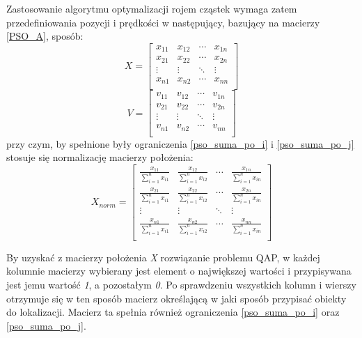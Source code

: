 Zastosowanie algorytmu optymalizacji rojem cząstek wymaga zatem przedefiniowania pozycji i prędkości w następujący, bazujący na macierzy \ref{PSO_A}, sposób:
\newline
\begin{equation}
X=
\begin{bmatrix}
x_{11} & x_{12} & \cdots & x_{1n} \\
x_{21} & x_{22} & \cdots & x_{2n} \\
\vdots & \vdots & \ddots & \vdots \\
x_{n1} & x_{n2} & \cdots & x_{nn} \\
\end{bmatrix}
\end{equation} 
\newline
\begin{equation}
V=
\begin{bmatrix}
v_{11} & v_{12} & \cdots & v_{1n} \\
v_{21} & v_{22} & \cdots & v_{2n} \\
\vdots & \vdots & \ddots & \vdots \\
v_{n1} & v_{n2} & \cdots & v_{nn} \\
\end{bmatrix}
\end{equation}
\newline
przy czym, by spełnione były ograniczenia \ref{pso_suma_po_i} i \ref{pso_suma_po_j} stosuje się normalizację macierzy położenia:
\newline
\begin{equation}
X_{norm}=
\begin{bmatrix}
\frac{x_{11}}{\sum\limits_{i=1}^n x_{i1}} & \frac{x_{12}}{\sum\limits_{i=1}^n x_{i2}} & \cdots &\frac{x_{1n}}{\sum\limits_{i=1}^n x_{in}} \\
\frac{x_{21}}{\sum\limits_{i=1}^n x_{i1}} & \frac{x_{22}}{\sum\limits_{i=1}^n x_{i2}} & \cdots & \frac{x_{2n}}{\sum\limits_{i=1}^n x_{in}} \\
\vdots & \vdots & \ddots & \vdots \\
\frac{x_{n1}}{\sum\limits_{i=1}^n x_{i1}} & \frac{x_{n2}}{\sum\limits_{i=1}^n x_{i2}} & \cdots & \frac{x_{nn}}{\sum\limits_{i=1}^n x_{in}} \\
\end{bmatrix}
\end{equation}
\newline

By uzyskać z macierzy położenia \textit{X} rozwiązanie problemu QAP, w każdej kolumnie macierzy wybierany jest element o największej wartości i przypisywana jest jemu wartość \textit{1}, a pozostałym \textit{0}. Po sprawdzeniu wszystkich kolumn i wierszy otrzymuje się w ten sposób macierz określającą w jaki sposób przypisać obiekty do lokalizacji. Macierz ta spełnia również ograniczenia \ref{pso_suma_po_i} oraz \ref{pso_suma_po_j}.

